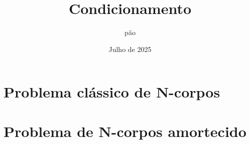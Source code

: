 \documentclass{article}
\title{Condicionamento}
\author{pão}
\date{Julho de 2025}
\begin{document}
\maketitle

\tableofcontents
\pagebreak



\section{Problema clássico de N-corpos}






\section{Problema de N-corpos amortecido}




\printbibliography
\end{document}
